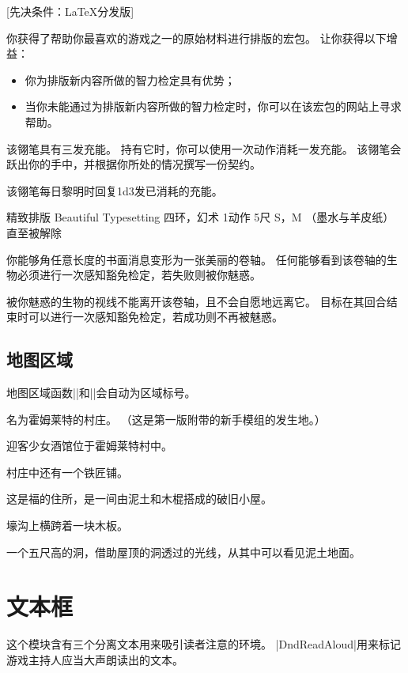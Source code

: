\documentclass[twocolumn]{ctexbook}
\begin{document}
[先决条件：\LaTeX{}分发版]

你获得了帮助你最喜欢的游戏之一的原始材料进行排版的宏包。
让你获得以下增益：

\begin{itemize}
	\item 你为排版新内容所做的智力检定具有优势；
	\item 当你未能通过为排版新内容所做的智力检定时，你可以在该宏包的网站上寻求帮助。
\end{itemize}


该翎笔具有三发充能。
持有它时，你可以使用一次动作消耗一发充能。
该翎笔会跃出你的手中，并根据你所处的情况撰写一份契约。

该翎笔每日黎明时回复1d3发已消耗的充能。

\DndSpellHeader%
  {精致排版 Beautiful Typesetting}
  {四环，幻术}
  {1动作}
  {5尺}
  {S，M （墨水与羊皮纸）}
  {直至被解除}

你能够角任意长度的书面消息变形为一张美丽的卷轴。
任何能够看到该卷轴的生物必须进行一次感知豁免检定，若失败则被你魅惑。

被你魅惑的生物的视线不能离开该卷轴，且不会自愿地远离它。
目标在其回合结束时可以进行一次感知豁免检定，若成功则不再被魅惑。

\section{地图区域}
地图区域函数|\DndArea|和|\DndSubArea|会自动为区域标号。

名为霍姆莱特的村庄。
（这是第一版附带的新手模组的发生地。）

迎客少女酒馆位于霍姆莱特村中。

村庄中还有一个铁匠铺。

这是福的住所，是一间由泥土和木棍搭成的破旧小屋。

壕沟上横跨着一块木板。

一个五尺高的洞，借助屋顶的洞透过的光线，从其中可以看见泥土地面。

\chapter{文本框}

这个模块含有三个分离文本用来吸引读者注意的环境。
|DndReadAloud|用来标记游戏主持人应当大声朗读出的文本。
\end{document}
